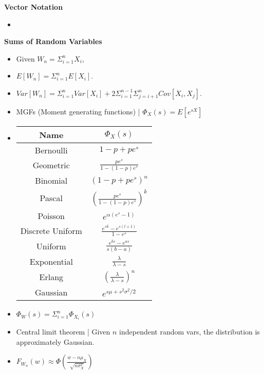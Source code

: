 \documentclass[8pt]{article}
\begin{document}
\textbf{Vector Notation}
\begin{itemize}
    \item
\end{itemize}
\textbf{Sums of Random Variables}
\begin{itemize}
    \item Given $W_n = \Sigma_{i = 1}^n X_i$,
    \item $E[W_n] = \Sigma_{i = 1}^n E[X_i]$.
    \item $Var[W_n] = \Sigma_{i = 1}^n Var[X_i] + 2 \Sigma_{i = 1}^{n - 1} \Sigma_{j = i + 1}^n Cov[X_i, X_j]$.
    \item MGFs (Moment generating functions) | $\Phi_X(s) = E[e^{sX}]$
    \item
    \begin{tabular}{|c|c|}
        \hline
        Name & $\Phi_X(s)$ \\
        \hline
        Bernoulli & $1 - p + pe^s$ \\
        Geometric & $\frac{pe^s}{1 - (1 - p)e^s}$ \\
        Binomial & $(1 - p + pe^s)^n$  \\
        Pascal & $(\frac{pe^s}{1 - (1 - p)e^s})^k$ \\
        Poisson & $e^{\alpha(e^s - 1)}$ \\
        Discrete Uniform & $\frac{e^{sk} - e^{s(l + 1)}}{1 - e^s}$ \\
        Uniform & $\frac{e^{bs} - e^{as}}{s(b - a)}$ \\
        Exponential & $\frac{\lambda}{\lambda - s}$ \\
        Erlang & $\left(\frac{\lambda}{\lambda - s}\right)^n$ \\
        Gaussian & $e^{s\mu + s^2\sigma^2/2}$ \\
        \hline
    \end{tabular}
    \item $\Phi_W(s) = \Sigma_{i = 1}^n \Phi_{X_i}(s)$
    \item Central limit theorem | Given $n$ independent random vars, the distribution is approximately Gaussian.
    \item $F_{W_n}(w) \approx \Phi\left(\frac{w - n \mu_X}{\sqrt{n \sigma_X^2}}\right)$
\end{itemize}
\end{document}
